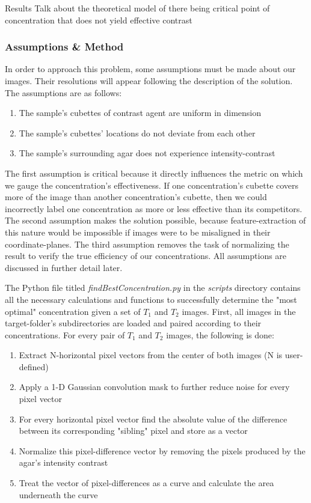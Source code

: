 \documentclass[a4paper,12pt]{article}
\begin{document}
\begin{section}{Results}
Talk about the theoretical model of there being critical point of concentration that does not yield effective contrast

\subsubsection{Assumptions \& Method}

In order to approach this problem, some assumptions must be made about our images. Their resolutions will appear following the description of the solution. The assumptions are as follows:

\singlespacing
\begin{enumerate}
\item The sample's cubettes of contrast agent are uniform in dimension
\item The sample's cubettes' locations do not deviate from each other
\item The sample's surrounding agar does not experience intensity-contrast
\end{enumerate}
\doublespacing

The first assumption is critical because it directly influences the metric on which we gauge the concentration's effectiveness. If one concentration's cubette covers more of the image than another concentration's cubette, then we could incorrectly label one concentration as more or less effective than its competitors. The second assumption makes the solution possible, because feature-extraction of this nature would be impossible if images were to be misaligned in their coordinate-planes. The third assumption removes the task of normalizing the result to verify the true efficiency of our concentrations. All assumptions are discussed in further detail later.

The Python file titled {\em findBestConcentration.py} in the {\em scripts} directory contains all the necessary calculations and functions to successfully determine the "most optimal" concentration given a set of $T_1$ and $T_2$ images. First, all images in the target-folder's subdirectories are loaded and paired according to their concentrations. For every pair of $T_1$ and $T_2$ images, the following is done:

\singlespacing
\begin{enumerate}
\item Extract N-horizontal pixel vectors from the center of both images (N is user-defined)
\item Apply a 1-D Gaussian convolution mask to further reduce noise for every pixel vector
\item For every horizontal pixel vector find the absolute value of the difference between its corresponding "sibling" pixel and store as a vector
\item Normalize this pixel-difference vector by removing the pixels produced by the agar's intensity contrast
\item Treat the vector of pixel-differences as a curve and calculate the area underneath the curve
\end{enumerate}


\end{section}
\end{document}
